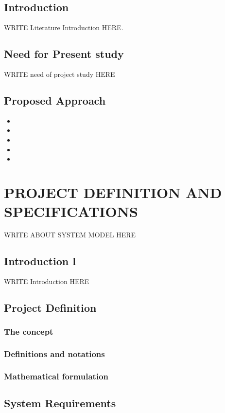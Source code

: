 \documentclass[12pt]{report}	%
\begin{document}
\section{Introduction }
WRITE Literature Introduction  HERE.  


\section{Need for Present study }
WRITE need of project study HERE 

\section{Proposed Approach}
\begin{itemize}
\item 
\item 
\item 
\item 
\item 
\end{itemize}


\chapter{PROJECT DEFINITION AND SPECIFICATIONS}
WRITE ABOUT SYSTEM MODEL HERE
\section{Introduction l}
WRITE Introduction  HERE



\section{Project Definition}

\subsection{The concept }


\subsection{Definitions and notations }
\subsection{Mathematical formulation  }

\section{System Requirements}
\end{document}
